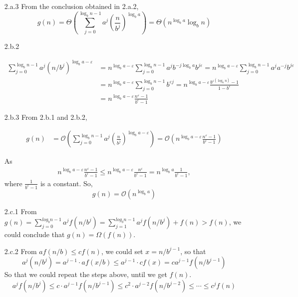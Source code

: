 \documentclass{assignment}
\begin{document}
\begin{homeworkProblem}
\begin{enumerate}
\item[2.a.3] From the conclusion obtained in 2.a.2, 
    $$
g(n)=\Theta\left(\sum_{j=0}^{\log _{b} n-1} a^{j}\left(\frac{n}{b^{j}}\right)^{\log _{b} a}\right) = \Theta(n^{\log _{b} a} \log _{b} n)
$$

\item[2.b.2] 



\begin{align*}
 \sum_{j=0}^{\log _{b} n -1} a^{j}\left(n / b^{j}\right)^{\log _{b} a-\varepsilon}&=n^{\log _{b} a-\varepsilon} \sum_{j=0}^{\log _{b} n -1} a^{j} b^{-j \log _{b} a} b^{j \varepsilon}
  =n^{\log _{b} a-\varepsilon} \sum_{j=0}^{\log _{b} n -1} a^{j} a^{-j} b^{j \varepsilon} \\
  &=n^{\log _{b} a-\varepsilon}  \sum_{j=0}^{\log _{b} n -1} b^{\varepsilon j}
  =n^{\log _{b} a-\varepsilon} \frac{b^{\varepsilon\left(\log _{b} n\right)}-1}{1 - b^{\varepsilon}}\\
  &=n^{\log _{b} a-\varepsilon} \frac{n^{\varepsilon}-1}{b^{\varepsilon}-1}
\end{align*}
\item[2.b.3] From 2.b.1 and 2.b.2, 


\begin{align*}
  g(n) &= \mathcal{O}\left(\sum_{j=0}^{\log_bn-1}a^j(\frac{n}{b^j})^{\log_ba - \varepsilon}\right) = \mathcal{O}(n^{\log _{b} a-\varepsilon} \frac{n^{\varepsilon}-1}{b^{\varepsilon}-1})
\end{align*}

As \begin{align*}
n^{\log _{b} a-\varepsilon} \frac{n^{\varepsilon}-1}{b^{\varepsilon}-1} \leq n^{\log _{b} a-\varepsilon} \frac{n^{\varepsilon}}{b^{\varepsilon}-1}=n^{\log _{b} a} \frac{1}{b^{\varepsilon}-1},
\end{align*}
where $\frac{1}{b^{\varepsilon}-1}$ is a constant.
So,
$$
  g(n) = \mathcal{O}(n^{\log_ba})
$$

\item[2.c.1]
From $g(n) = \sum_{j = 0}^{log_bn - 1} a^jf(n / b^j) = \sum_{j = 1}^{log_bn - 1} a^jf(n / b^j) + f(n) > f(n)$, we could conclude that $g(n) = \Omega(f(n))$.

\item[2.c.2] 
From $af(n/b) \leq cf(n)$, we could set $x = n / b^{j-1}$,  so that $$a^j(n/b^j) = a^{j-1} \cdot a f(x/b) \leq a^{j-1} \cdot cf(x) = c a^{j-1}f( n / b^{j-1})$$
So that  we could repeat the steps above, until we get $f(n)$. 
$$
a^{j} f\left(n / b^{j}\right) \leq c \cdot a^{j-1} f(n/b^{j-1}) \leq c^2 \cdot a^{j-2} f(n/b^{j-2}) \leq \cdots \leq c^jf(n)
$$


\end{enumerate}
\end{homeworkProblem}
\end{document}
